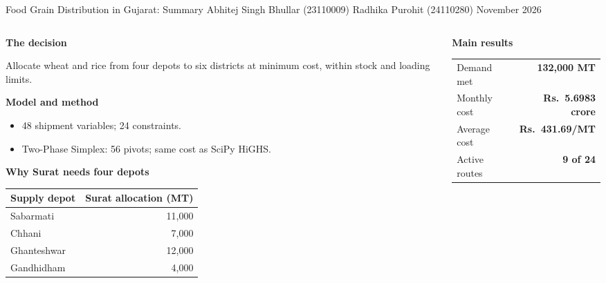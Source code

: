 \documentclass[aspectratio=169,10pt]{beamer}
\begin{document}
\begin{frame}[t]{Food Grain Distribution in Gujarat: Summary}
{\scriptsize Abhitej Singh Bhullar (23110009) \quad Radhika Purohit (24110280) \hfill November 2026}\par\vspace{0.10cm}\small
\begin{columns}[T,onlytextwidth]
\begin{column}{0.49\textwidth}\small
\textbf{The decision}\par
Allocate wheat and rice from four depots to six districts at minimum cost, within stock and loading limits.
\vspace{0.15cm}

\textbf{Model and method}
\begin{itemize}\setlength{\itemsep}{1pt}
\item 48 shipment variables; 24 constraints.
\item Two-Phase Simplex: 56 pivots; same cost as SciPy HiGHS.
\end{itemize}
\vspace{0.1cm}
\textbf{Why Surat needs four depots}\par
{\small
\begin{tabular}{lr}
\toprule
Supply depot & Surat allocation (MT)\\
\midrule
Sabarmati & 11,000\\
Chhani & 7,000\\
Ghanteshwar & 12,000\\
Gandhidham & 4,000\\
\bottomrule
\end{tabular}}
\end{column}
\begin{column}{0.47\textwidth}\small
\textbf{Main results}\par\vspace{0.1cm}
\begin{tabular}{@{}lr@{}}
Demand met & \textbf{132,000 MT}\\[2pt]
Monthly cost & \textbf{Rs.\ 5.6983 crore}\\[2pt]
Average cost & \textbf{Rs.\ 431.69/MT}\\[2pt]
Active routes & \textbf{9 of 24}\\
\end{tabular}
\vspace{0.25cm}


\end{column}
\end{columns}
\end{frame}
\end{document}
